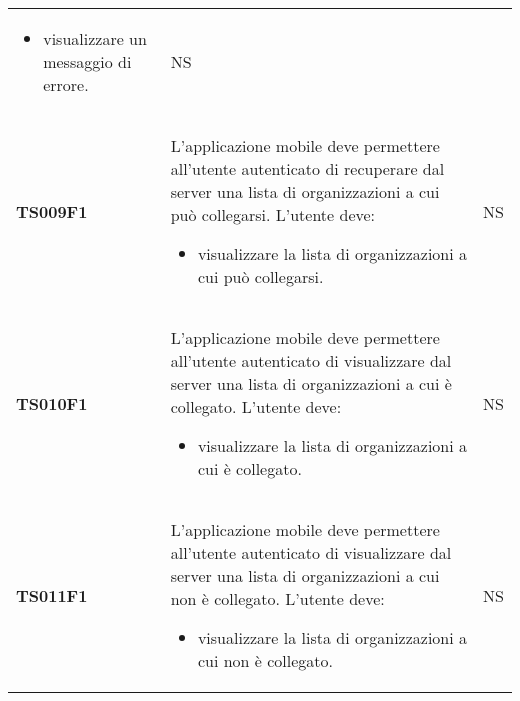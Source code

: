 \documentclass[../piano-di-qualifica.tex]{subfiles}
\begin{document}
\begin{centering}
\begin{longtable}[H]{>{\centering\bfseries}m{3cm} >{}p{10cm} >{\centering\arraybackslash}m{3cm}}
\begin{itemize}
      \item visualizzare un messaggio di errore.
    \end{itemize}
                       & NS                                                                                                                                                                                                                                                               \\
    TS009F1            & L'applicazione mobile deve permettere all'utente autenticato di recuperare dal server una lista di organizzazioni a cui può collegarsi. \newline
    L'utente deve:
    \begin{itemize}
      \item visualizzare la lista di organizzazioni a cui può collegarsi.
    \end{itemize}
                       & NS                                                                                                                                                                                                                                                               \\
    TS010F1            & L'applicazione mobile deve permettere all'utente autenticato di visualizzare dal server una lista di organizzazioni a cui è collegato. \newline
    L'utente deve:
    \begin{itemize}
      \item visualizzare la lista di organizzazioni a cui è collegato.
    \end{itemize}
                       & NS                                                                                                                                                                                                                                                               \\
    TS011F1            & L'applicazione mobile deve permettere all'utente autenticato di visualizzare dal server una lista di organizzazioni a cui non è collegato. \newline
    L'utente deve:
    \begin{itemize}
      \item visualizzare la lista di organizzazioni a cui non è collegato.
    \end{itemize}
                       & NS                                                                                                                                                                                                                                                               \\

\end{longtable}
\end{centering}
\end{document}
